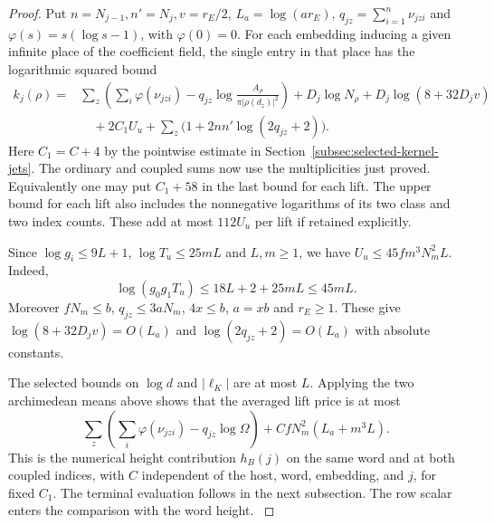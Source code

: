 \begin{proof}

Put \(n=N_{j-1}, n'=N_j, v=r_E/2\), \(L_a=\log(a r_E)\),
\(q_{jz}=\sum_{i=1}^n\nu_{jzi}\) and
\(\varphi(s)=s(\log s-1)\), with \(\varphi(0)=0\).
For each embedding inducing a given infinite place of the
coefficient field, the single entry in that place has the
logarithmic squared bound
\begin{align*}
 k_j(\rho)={}&\sum_z\left(\sum_i\varphi(\nu_{jzi})
       -q_{jz}\log\frac{A_\rho}{\pi|\rho(d_z)|^2}\right)
      + D_j\log N_\rho + D_j\log(8+32D_jv)\\
 &\quad +2C_1 U_u+
           \sum_z\bigl(1+2nn'\log(2q_{jz}+2)\bigr).
\end{align*}
Here \(C_1=C+4\) by the pointwise estimate in
Section~\ref{subsec:selected-kernel-jets}.
The ordinary and coupled sums now use the multiplicities just
proved. Equivalently one may put \(C_1+58\) in the last bound
for each lift. The upper bound for each lift also includes the
nonnegative logarithms of its two class and two index counts.
These add at most \(112U_u\) per lift if retained explicitly.


Since \(\log g_i\le9L+1\), \(\log T_u\le25mL\) and
\(L,m\ge1\), we have \(U_u\le45fm^3N_m^2 L\).
Indeed,
\[
 \log(g_0g_1T_u)\le18L+2+25mL\le45mL .
\]
Moreover \(fN_m\le b\), \(q_{jz}\le3aN_m\),
\(4x\le b\), \(a=xb\) and \(r_E\ge1\). These give
\(\log(8+32D_jv)=O(L_a)\) and
\(\log(2q_{jz}+2)=O(L_a)\) with absolute constants.

The selected bounds on \(\log d\) and \(|\ell_K|\) are at
most \(L\). Applying the two archimedean means above shows
that the averaged lift price is at most
\[
  \sum_z\left(\sum_i\varphi(\nu_{jzi})-q_{jz}\log\Omega\right)
       +C fN_m^2(L_a+m^3L).
\]
This is the numerical height contribution \(h_B(j)\) on the
same word and at both coupled indices, with \(C\) independent
of the host, word, embedding, and \(j\), for fixed \(C_1\).
The terminal evaluation follows in the next subsection. The
row scalar enters the comparison with the word height.
\label{cor:selected-period-means-3}
\end{proof}
